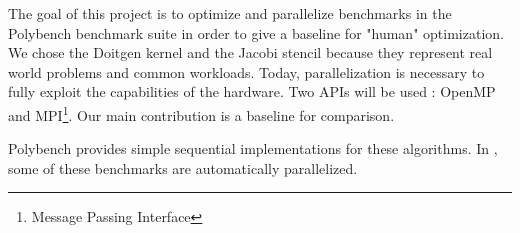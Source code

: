  The goal of this project is to optimize and parallelize benchmarks in the Polybench benchmark suite in order to give a baseline for "human" optimization. We chose the Doitgen kernel and the Jacobi stencil because they represent real world problems and common workloads. Today, parallelization is necessary to fully exploit the capabilities of the hardware. Two APIs will be used : OpenMP and MPI\footnote{Message Passing Interface}. Our main contribution is a baseline for comparison.

Polybench\cite{polybench} provides simple sequential implementations for these algorithms. In \cite{data-centric-python}, some of these benchmarks are automatically parallelized.
